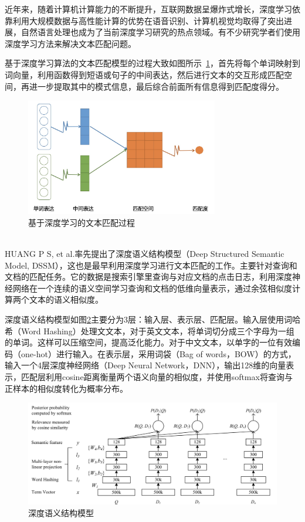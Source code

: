 近年来，随着计算机计算能力的不断提升，互联网数据呈爆炸式增长，深度学习依靠利用大规模数据与高性能计算的优势在语音识别、计算机视觉均取得了突出进展，自然语言处理也成为了当前深度学习研究的热点领域。有不少研究学者们使用深度学习方法来解决文本匹配问题。

基于深度学习算法的文本匹配模型的过程大致如图所示~\ref{fig:deep_text_matching}，首先将每个单词映射到词向量，利用函数得到短语或句子的中间表达，然后进行文本的交互形成匹配空间，再进一步提取其中的模式信息，最后综合前面所有信息得到匹配度得分。~\\
\begin{figure}[htbp!]
\centering
\includegraphics[width=0.75\textwidth]{figures/DeepTextMatching.jpg}
\caption{基于深度学习的文本匹配过程}\label{fig:deep_text_matching}
\vspace{-1em}
\end{figure}
~\\HUANG P S, et al.率先提出了深度语义结构模型\cite{Huang2013LearningDS}（Deep Structured Semantic Model, DSSM），这也是最早利用深度学习进行文本匹配的工作。主要针对查询和文档的匹配任务。它的数据是搜索引擎里查询与对应文档的点击日志，利用深度神经网络在一个连续的语义空间学习查询和文档的低维向量表示，通过余弦相似度计算两个文本的语义相似度。

深度语义结构模型如图\ref{fig:DSSM}主要分为3层：输入层、表示层、匹配层。输入层使用词哈希（Word Hashing）处理文文本，对于英文文本，将单词切分成三个字母为一组的单词。这样可以压缩空间，提高泛化能力。对于中文文本，以单字的一位有效编码（one-hot）进行输入。在表示层，采用词袋（Bag of words，BOW）的方式，输入一个4层深度神经网络\cite{hinton2006fast}（Deep Neural Network，DNN），输出128维的向量表示，匹配层利用cosine距离衡量两个语义向量的相似度，并使用softmax将查询与正样本的相似度转化为概率分布。

\begin{figure}[htbp!]
\vspace{1em}
\centering
\includegraphics[width=1.0\linewidth]{figures/DSSM.png}
\caption{深度语义结构模型}\label{fig:DSSM}
\vspace{1em}
\end{figure}

